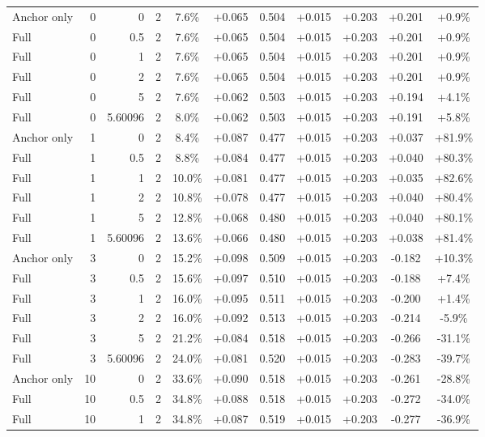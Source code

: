 \begin{table}[htbp]
\begin{tabular}{lrrrccccccc}
Anchor only & 0 & 0 & 2 & 7.6\% & +0.065 & 0.504 & +0.015 & +0.203 & +0.201 & +0.9\% \\
Full & 0 & 0.5 & 2 & 7.6\% & +0.065 & 0.504 & +0.015 & +0.203 & +0.201 & +0.9\% \\
Full & 0 & 1 & 2 & 7.6\% & +0.065 & 0.504 & +0.015 & +0.203 & +0.201 & +0.9\% \\
Full & 0 & 2 & 2 & 7.6\% & +0.065 & 0.504 & +0.015 & +0.203 & +0.201 & +0.9\% \\
Full & 0 & 5 & 2 & 7.6\% & +0.062 & 0.503 & +0.015 & +0.203 & +0.194 & +4.1\% \\
Full & 0 & 5.60096 & 2 & 8.0\% & +0.062 & 0.503 & +0.015 & +0.203 & +0.191 & +5.8\% \\
Anchor only & 1 & 0 & 2 & 8.4\% & +0.087 & 0.477 & +0.015 & +0.203 & +0.037 & +81.9\% \\
Full & 1 & 0.5 & 2 & 8.8\% & +0.084 & 0.477 & +0.015 & +0.203 & +0.040 & +80.3\% \\
Full & 1 & 1 & 2 & 10.0\% & +0.081 & 0.477 & +0.015 & +0.203 & +0.035 & +82.6\% \\
Full & 1 & 2 & 2 & 10.8\% & +0.078 & 0.477 & +0.015 & +0.203 & +0.040 & +80.4\% \\
Full & 1 & 5 & 2 & 12.8\% & +0.068 & 0.480 & +0.015 & +0.203 & +0.040 & +80.1\% \\
Full & 1 & 5.60096 & 2 & 13.6\% & +0.066 & 0.480 & +0.015 & +0.203 & +0.038 & +81.4\% \\
Anchor only & 3 & 0 & 2 & 15.2\% & +0.098 & 0.509 & +0.015 & +0.203 & -0.182 & +10.3\% \\
Full & 3 & 0.5 & 2 & 15.6\% & +0.097 & 0.510 & +0.015 & +0.203 & -0.188 & +7.4\% \\
Full & 3 & 1 & 2 & 16.0\% & +0.095 & 0.511 & +0.015 & +0.203 & -0.200 & +1.4\% \\
Full & 3 & 2 & 2 & 16.0\% & +0.092 & 0.513 & +0.015 & +0.203 & -0.214 & -5.9\% \\
Full & 3 & 5 & 2 & 21.2\% & +0.084 & 0.518 & +0.015 & +0.203 & -0.266 & -31.1\% \\
Full & 3 & 5.60096 & 2 & 24.0\% & +0.081 & 0.520 & +0.015 & +0.203 & -0.283 & -39.7\% \\
Anchor only & 10 & 0 & 2 & 33.6\% & +0.090 & 0.518 & +0.015 & +0.203 & -0.261 & -28.8\% \\
Full & 10 & 0.5 & 2 & 34.8\% & +0.088 & 0.518 & +0.015 & +0.203 & -0.272 & -34.0\% \\
Full & 10 & 1 & 2 & 34.8\% & +0.087 & 0.519 & +0.015 & +0.203 & -0.277 & -36.9\% \\

\end{tabular}
\end{table}
